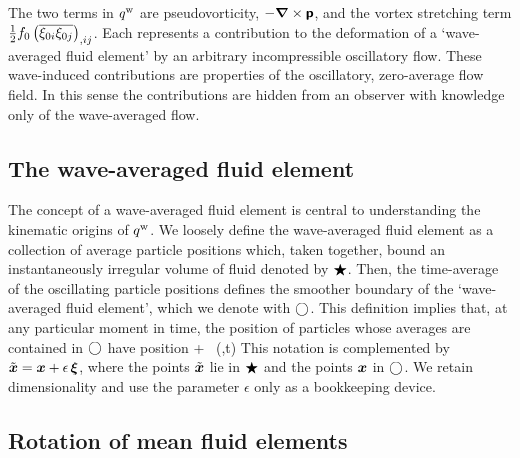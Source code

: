 \documentclass[12pt, oneside]{book}
\begin{document}
The two terms in $q^{\mathrm{w}}$ are pseudovorticity, $-\boldsymbol \nabla \times \boldsymbol{\mathsf{p}}$, and the vortex stretching term $\tfrac{1}{2} f_0 \left ( \overline{ \xi_{0i} \xi_{0j} } \right )_{,ij}$.  Each represents a contribution to the deformation of a `wave-averaged fluid element' by an arbitrary incompressible oscillatory flow.  These wave-induced contributions are properties of the oscillatory, zero-average flow field.  In this sense the contributions are hidden from an observer with knowledge only of the wave-averaged flow.  


\subsection{The wave-averaged fluid element}

The concept of a wave-averaged fluid element is central to understanding the kinematic origins of $q^{\mathrm{w}}$.  We loosely define the wave-averaged fluid element as a collection of average particle positions which, taken together, bound an instantaneously irregular volume of fluid denoted by $\bigstar$.  Then, the time-average of the oscillating particle positions defines the smoother boundary of the `wave-averaged fluid element', which we denote with $\bigcirc$.  This definition implies that, at any particular moment in time, the position of particles whose averages are contained in $\bigcirc$ have position
\beq
\wavyc {} \meanc + \ep \, \bxi(\bx,t) \per
\eeq 
This notation is complemented by $\tilde {\boldsymbol x} = \boldsymbol x + \epsilon \, \boldsymbol {\xi}$, where the points $\tilde {\boldsymbol x}$ lie in $\bigstar$ and the points $\boldsymbol x$ in $\bigcirc$.  We retain dimensionality and use the parameter $\epsilon$ only as a bookkeeping device.

\subsection{Rotation of mean fluid elements}
\end{document}
